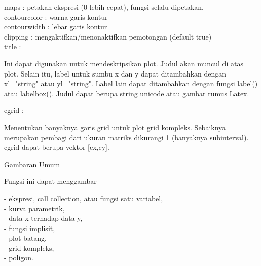 \documentclass[a4paper,10pt]{article}
\begin{document}
\begin{eulernotebook}
\begin{eulercomment}
\begin{eulercomment}
\begin{eulercomment}
\begin{eulercomment}
\begin{eulercomment}
\begin{eulercomment}
\begin{eulerttcomment}
\end{eulerttcomment}
\begin{eulercomment}
maps      : petakan ekspresi (0 lebih cepat), fungsi selalu dipetakan.\\
contourcolor : warna garis kontur\\
contourwidth : lebar garis kontur\\
clipping  : mengaktifkan/menonaktifkan pemotongan (default true)\\
title     :\\
\end{eulercomment}
\begin{eulerttcomment}
  Ini dapat digunakan untuk mendeskripsikan plot. Judul akan muncul di atas
  plot. Selain itu, label untuk sumbu x dan y dapat ditambahkan dengan
  xl="string" atau yl="string". Label lain dapat ditambahkan dengan fungsi
  label() atau labelbox(). Judul dapat berupa string unicode atau gambar
  rumus Latex.
\end{eulerttcomment}
\begin{eulercomment}
cgrid     :\\
\end{eulercomment}
\begin{eulerttcomment}
  Menentukan banyaknya garis grid untuk plot grid kompleks.
  Sebaiknya merupakan pembagi dari ukuran matriks dikurangi 1 (banyaknya
  subinterval). cgrid dapat berupa vektor [cx,cy].
\end{eulerttcomment}
\begin{eulercomment}

Gambaran Umum

Fungsi ini dapat menggambar

- ekspresi, call collection, atau fungsi satu variabel,\\
- kurva parametrik,\\
- data x terhadap data y,\\
- fungsi implisit,\\
- plot batang,\\
- grid kompleks,\\
- poligon.


\end{eulercomment}
\end{eulercomment}
\end{eulercomment}
\end{eulercomment}
\end{eulercomment}
\end{eulercomment}
\end{eulercomment}
\end{eulernotebook}
\end{document}
